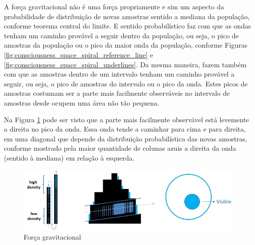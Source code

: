 A força gravitacional não é uma força propriamente e sim um aspecto da probabilidade de distribuição de novas amostras sentido a mediana da população, conforme teorema central do limite. E sentido probabilístico faz com que as ondas tenham um caminho provável a seguir dentro da população, ou seja, o pico de amostras da população ou o pico da maior onda da população, conforme Figuras \ref{fig:consciousness_space_spiral_reference_line} e \ref{fig:consciousness_space_spiral_underlines}. Da mesma maneira, fazem também com que as amostras dentro de um intervalo tenham um caminho provável a seguir, ou seja, o pico de amostras do intervalo ou o pico da onda. Estes picos de amostras costumam ser a parte mais facilmente observáveis no intervalo de amostras desde ocupem uma área não tão pequena.

Na Figura \ref{fig:consciousness_gravitational_force} pode ser visto que a parte mais facilmente observável está levemente a direita no pico da onda. Essa onda tende a caminhar para cima e para direita, em uma diagonal que depende da distribuição probabilística das novas amostras, conforme mostrado pela maior quantidade de colunas azuis a direita da onda (sentido à mediana) em relação à esquerda.
	\begin{figure}[H]
	\caption{Força gravitacional}
	\label{fig:consciousness_gravitational_force}
	\centering
	\includegraphics[scale=.7]{sections/images/consciousness_gravitational_force.jpg}
	\end{figure}

